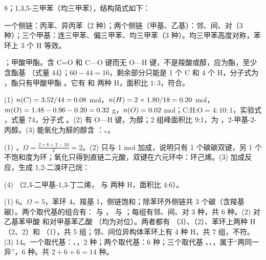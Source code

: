 \begin{jiexilist}
\item 8；1,3,5-三甲苯（均三甲苯），结构简式如下：\par{\centering{}\par}一个侧链：丙苯、异丙苯（2 种）；两个侧链（甲基、乙基）：邻、间、对（3 种）；三个甲基：连三甲苯、偏三甲苯、均三甲苯（3 种）。均三甲苯高度对称，苯环上 3 个 H 等效。
\item {}；甲酸甲酯。含 C=O 和 C—O 键而无 O—H 键，不是羧酸或醇，应为酯，至少含酯基 （式量 44）；$60-44=16$，剩余部分只能是 1 个 C 和 4 个 H，分子式为 ，酯只有甲酸甲酯 。它有  和  两种 H，面积比 $1:3$，符合。
\item (1) $n(C)=3.52/44=0.08$ mol，$n(H)=2\times1.80/18=0.20$ mol，$m(O)=1.48-0.96-0.20=0.32$ g，$n(O)=0.02$ mol；C:H:O$=4:10:1$，实验式 ，式量 74，分子式 。(2) 有 O—H 键，为醇；2 组峰面积比 9:1，为 ，2-甲基-2-丙醇。(3) 能氧化为醛的醇含 ：、。
\item (1) ，$\Omega=\frac{2\times6+2-10}{2}=2$。(2) 只与 1 mol  加成，说明只有 1 个碳碳双键，另 1 个不饱和度为环；氧化只得到直链二元酸，双键在六元环中：环己烯。(3) 加成反应，生成 1,2-二溴环己烷：\par{\centering{}\quad{}\quad{}\par}(4) （2,3-二甲基-1,3-丁二烯， 与  两种 H，面积比 4:6）。
\item (1) 6。$\Omega=5$，苯环 4、羧基 1，侧链饱和；除苯环外侧链共 3 个碳（含羧基碳）。两个取代基的组合有： 与 ， 与 ；每组有邻、间、对 3 种，共 6 种。(2) 对乙基苯甲酸  和对甲基苯乙酸 （均为对位）。两者都有 （3）、（2）、苯环上两种 H（2、2）和 （1），共 5 组；邻、间位异构体苯环上有 4 种 H，共 7 组，不符。(3) 14。一个取代基：、，2 种；两个取代基：6 种；三个取代基 、、，属于“两同一异”，6 种。共 $2+6+6=14$ 种。
\end{jiexilist}
